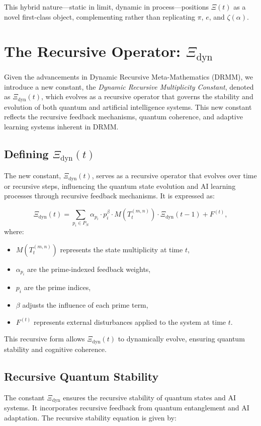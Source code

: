 \documentclass{article}
\theoremstyle{plain}
\begin{document}
\begin{itemize}
This hybrid nature—static in limit, dynamic in process—positions \(\Xi(t) \) as a novel first-class object, complementing rather than replicating \( \pi \), \( e \), and \( \zeta(\alpha) \).



\section{The Recursive Operator: $\Xi_{\text{dyn}}$}

Given the advancements in Dynamic Recursive Meta-Mathematics (DRMM), we introduce a new constant, the \textit{Dynamic Recursive Multiplicity Constant}, denoted as $\Xi_{\text{dyn}}(t)$, which evolves as a recursive operator that governs the stability and evolution of both quantum and artificial intelligence systems. This new constant reflects the recursive feedback mechanisms, quantum coherence, and adaptive learning systems inherent in DRMM.

\subsection{Defining $\Xi_{\text{dyn}}(t)$}
The new constant, $\Xi_{\text{dyn}}(t)$, serves as a recursive operator that evolves over time or recursive steps, influencing the quantum state evolution and AI learning processes through recursive feedback mechanisms. It is expressed as:

\[
\Xi_{\text{dyn}}(t) = \sum_{p_i \in P_N} \alpha_{p_i} \cdot p_i^{\beta} \cdot M(T_t^{(m, n)}) \cdot \Xi_{\text{dyn}}(t-1) + F^{(t)},
\]
where:
\begin{itemize}
    \item $M(T_t^{(m, n)})$ represents the state multiplicity at time $t$,
    \item $\alpha_{p_i}$ are the prime-indexed feedback weights,
    \item $p_i$ are the prime indices,
    \item $\beta$ adjusts the influence of each prime term,
    \item $F^{(t)}$ represents external disturbances applied to the system at time $t$.
\end{itemize}

This recursive form allows $\Xi_{\text{dyn}}(t)$ to dynamically evolve, ensuring quantum stability and cognitive coherence.

\subsection{Recursive Quantum Stability}
The constant $\Xi_{\text{dyn}}$ ensures the recursive stability of quantum states and AI systems. It incorporates recursive feedback from quantum entanglement and AI adaptation. The recursive stability equation is given by:


\end{itemize}
\end{document}
